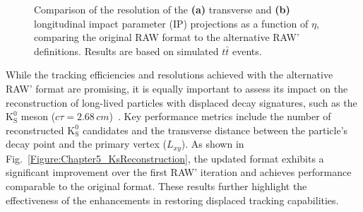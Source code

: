 \begin{figure}[h]
    \caption[Resolution of IP projections vs $\eta$ for RAW and RAW']{Comparison of the resolution of the \textbf{(a)} transverse and \textbf{(b)} longitudinal impact parameter (IP) projections as a function of $\eta$, comparing the original RAW format to the alternative RAW' definitions. Results are based on simulated $t\bar{t}$ events.}
    \label{Figure:Chapter5_ResolutionComparison}

    \label{Figure:Chapter5_ResolutionComparison}
\end{figure}

While the tracking efficiencies and resolutions achieved with the alternative RAW' format are promising, it is equally important to assess its impact on the reconstruction of long-lived particles with displaced decay signatures, such as the $\mathrm{K}_\mathrm{S}^0$ meson ($c\tau = 2.68\,\unit{cm}$)~\cite{ParticleMasses}. Key performance metrics include the number of reconstructed $\mathrm{K}_\mathrm{S}^0$ candidates and the transverse distance between the particle’s decay point and the primary vertex ($L_{xy}$). As shown in Fig.~\ref{Figure:Chapter5_KsReconstruction}, the updated format exhibits a significant improvement over the first RAW' iteration and achieves performance comparable to the original format. These results further highlight the effectiveness of the enhancements in restoring displaced tracking capabilities.

